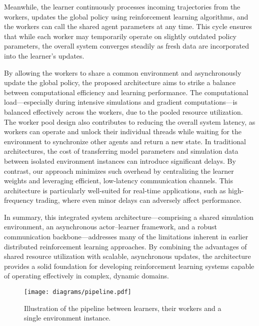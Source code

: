 \documentclass[11pt]{article}
\begin{document}
    Meanwhile, the learner continuously processes incoming trajectories from the workers, updates the global policy using reinforcement learning algorithms,
    and the workers can call the shared agent parameters at any time.
    This cycle ensures that while each worker may temporarily operate on slightly outdated policy parameters,
    the overall system converges steadily as fresh data are incorporated into the learner's updates.

    By allowing the workers to share a common environment and asynchronously update the global policy,
    the proposed architecture aims to strike a balance between computational efficiency and learning performance.
    The computational load—especially during intensive simulations and gradient computations—is balanced effectively
    across the workers, due to the pooled resource utilization.
    The worker pool design also contributes to reducing the overall system latency,
    as workers can operate and unlock their individual threads while waiting for the environment to synchronize other agents and return a new state.
    In traditional architectures, the cost of transferring model parameters and simulation data between isolated environment instances can introduce significant delays.
    By contrast, our approach minimizes such overhead by centralizing the learner weights and leveraging efficient, low-latency communication channels.
    This architecture is particularly well-suited for real-time applications, such as high-frequency trading,
    where even minor delays can adversely affect performance.

    In summary, this integrated system architecture—comprising a shared simulation environment, an asynchronous actor–learner framework, and
    a robust communication backbone—addresses many of the limitations inherent in earlier distributed reinforcement learning approaches.
    By combining the advantages of shared resource utilization with scalable, asynchronous updates, the architecture provides a solid foundation for
    developing reinforcement learning systems capable of operating effectively in complex, dynamic domains.

    \begin{figure}
        \centering
        \texttt{[image: diagrams/pipeline.pdf]}
        \caption{Illustration of the pipeline between learners, their workers and a single environment instance.}
        \label{fig:lob_simulation}
    \end{figure}
\end{document}
